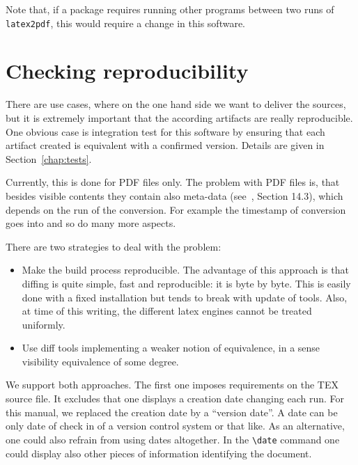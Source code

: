 Note that, if a package requires running other programs 
between two runs of \texttt{latex2pdf}, 
this would require a change in this software. 

\section{Checking reproducibility}\label{sec:chkReprod}

There are use cases, where on the one hand side we want to deliver the sources, 
but it is extremely important that the according artifacts are really reproducible. 
One obvious case is integration test for this software 
by ensuring that each artifact created 
is equivalent with a confirmed version. 
Details are given in Section~\ref{chap:tests}. 



Currently, this is done for PDF files only. 
The problem with PDF files is, that besides visible contents 
they contain also meta-data (see~\cite{pdf17}, Section 14.3), 
which depends on the run of the conversion. 
For example the timestamp of conversion goes into and so do many more aspects. 

There are two strategies to deal with the problem: 
%
\begin{itemize}
  \item 
  Make the build process reproducible. 
  The advantage of this approach is that diffing is quite simple, fast and reproducible: 
  it is byte by byte. 
  This is easily done with a fixed installation but tends to break with update of tools. 
  Also, at time of this writing, the different latex engines cannot be treated uniformly. 
  \item 
  Use diff tools implementing a weaker notion of equivalence, 
  in a sense visibility equivalence of some degree. 
\end{itemize}

We support both approaches. 
The first one imposes requirements on the TEX source file. 
It excludes that one displays a creation date changing each run. 
For this manual, we replaced the creation date by a ``version date''. 
A date can be only date of check in of a version control system or that like. 
As an alternative, one could also refrain from using dates altogether. 
In the \texttt{\textbackslash date} command 
one could display also other pieces of information identifying the document. 

